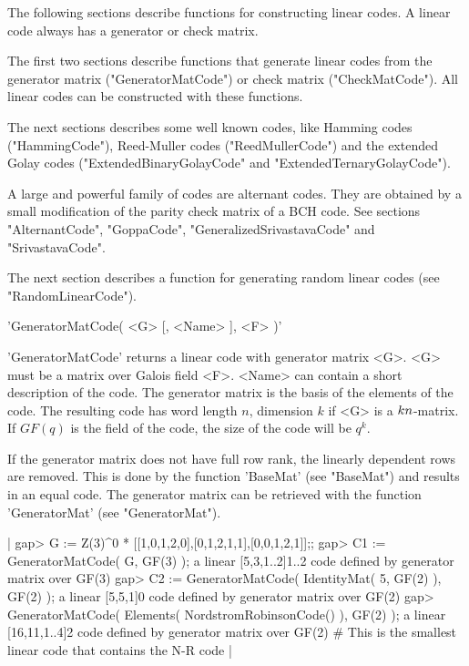 
The   following  sections   describe  functions for  constructing  linear
codes. A linear code always has a generator or check matrix.

The first two sections describe functions that generate linear codes from
the     generator    matrix   ("GeneratorMatCode")   or    check   matrix
("CheckMatCode").  All   linear codes can     be  constructed with  these
functions.

The next sections describes   some well known  codes, like  Hamming codes
("HammingCode"),  Reed-Muller codes  ("ReedMullerCode") and the  extended
Golay codes ("ExtendedBinaryGolayCode" and "ExtendedTernaryGolayCode").

A large  and  powerful family  of  codes  are alternant  codes. They  are
obtained by a  small  modification of the  parity  check matrix of  a BCH
code.        See      sections         "AlternantCode",      "GoppaCode",
"GeneralizedSrivastavaCode" and "SrivastavaCode".

The next section describes a function for  generating random linear codes
(see "RandomLinearCode").


'GeneratorMatCode( <G> [, <Name> ], <F> )'

'GeneratorMatCode'  returns a linear  code with generator matrix <G>. <G>
must be  a matrix  over Galois  field   <F>. <Name> can  contain  a short
description of  the  code.  The  generator matrix  is  the basis  of  the
elements of the  code. The resulting code  has word length $n$, dimension
$k$ if <G> is a $k \* n$-matrix. If $GF(q)$ is the field of the code, the
size of the code will be $q^k$.

If the   generator  matrix does  not  have  full row   rank, the linearly
dependent rows  are removed. This is  done by the function 'BaseMat' (see
"BaseMat")  and results  in an equal  code. The  generator  matrix can be
retrieved with the function 'GeneratorMat' (see "GeneratorMat").

|    gap> G := Z(3)^0 * [[1,0,1,2,0],[0,1,2,1,1],[0,0,1,2,1]];;
    gap> C1 := GeneratorMatCode( G, GF(3) );
    a linear [5,3,1..2]1..2 code defined by generator matrix over GF(3)
    gap> C2 := GeneratorMatCode( IdentityMat( 5, GF(2) ), GF(2) );
    a linear [5,5,1]0 code defined by generator matrix over GF(2)
    gap> GeneratorMatCode( Elements( NordstromRobinsonCode() ), GF(2) );
    a linear [16,11,1..4]2 code defined by generator matrix over GF(2)
    # This is the smallest linear code that contains the N-R code |

